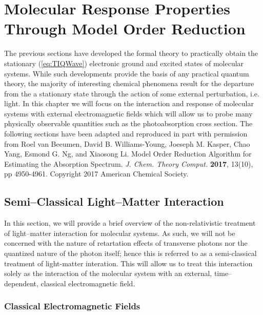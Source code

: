 \chapter{Molecular Response Properties Through Model Order Reduction}
\label{ch:MOR}


The previous sections have developed the formal theory to practically obtain the stationary 
(\cref{eq:TIQWave}) electronic ground and excited states of molecular systems.
While such developments provide the basis of any practical quantum theory, the majority of interesting chemical
phenomena result for the departure from the a stationary state through the action of some external perturbation,
i.e. light. In this chapter we will focus on the interaction and response of molecular systems with external 
electromagnetic fields which will allow us to probe many physically observable quantities such as
the photoabsorption cross section. The following sections have been adapted and reproduced in part with
permission from Roel van Beeumen, David B. Williams-Young, Joeseph M. Kasper, Chao Yang, Esmond G. Ng,
and Xiaosong Li. Model Order Reduction Algorithm for Estimating the Absorption Spectrum. 
\emph{J. Chem. Theory Comput.} \textbf{2017}, 13(10), pp 4950-4961. Copyright 2017 American Chemical
Society.


\section{Semi--Classical Light--Matter Interaction}
\label{sec:SCLMI}

In this section, we will provide a brief overview of the non-relativistic treatment of
light--matter interaction for molecular systems. As such, we will not be concerned with
the nature of retartation effects of transverse photons nor the quantized nature of
the photon itself; hence this is referred to as a semi-classical treatment of light-matter
interation. This will allow us to treat this interaction solely as the interaction of
the molecular system with an external, time--dependent, classical electromagnetic field. 

\subsection{Classical Electromagnetic Fields}

